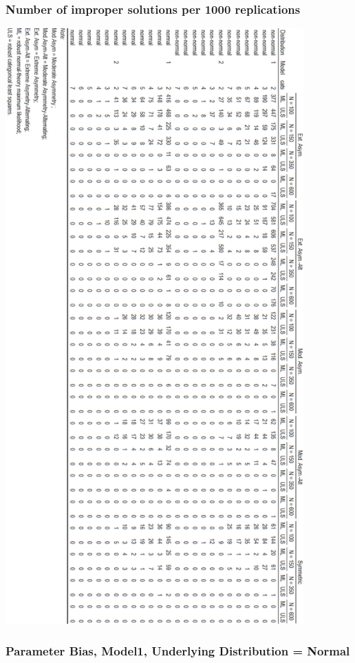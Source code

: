 \documentclass[10,a4paperpaper,]{article}
\begin{document}
\subsubsection{Number of improper solutions per 1000 replications}

\includegraphics[width=325pt]{./figures/tabA4_A5}

\subsubsection{Parameter Bias, Model1, Underlying Distribution = Normal}
\end{document}
